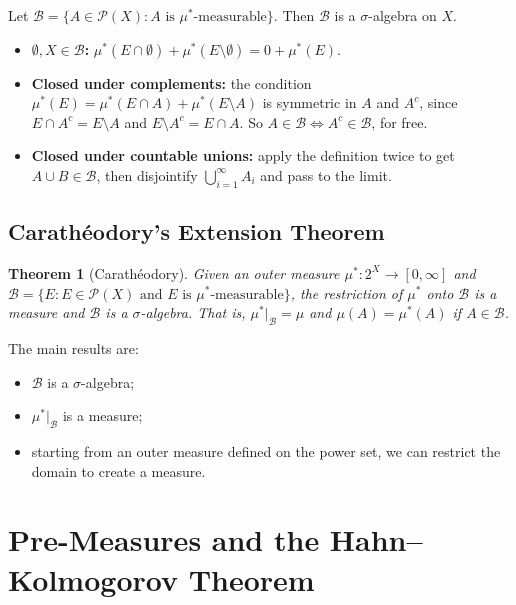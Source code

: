 \documentclass[11pt]{article}
\theoremstyle{definition}
\theoremstyle{plain}
\newtheorem{theorem}[definition]{Theorem}
\newcommand{\B}{\mathcal{B}}
\newcommand{\Pow}{\mathcal{P}}
\newcommand{\ostar}{\mu^{*}}
\begin{document}
Let $\B = \{ A \in \Pow(X) : A \text{ is } \ostar\text{-measurable} \}$.
Then $\B$ is a $\sigma$-algebra on $X$.

\begin{itemize}
  \item \textbf{$\emptyset, X \in \B$:}
        $\ostar(E \cap \emptyset) + \ostar(E \setminus \emptyset)
          = 0 + \ostar(E)$.
  \item \textbf{Closed under complements:} the condition
        $\ostar(E) = \ostar(E \cap A) + \ostar(E \setminus A)$ is
        symmetric in $A$ and $A^{c}$, since $E \cap A^{c} =
        E \setminus A$ and $E \setminus A^{c} = E \cap A$. So
        $A \in \B \iff A^{c} \in \B$, for free.
  \item \textbf{Closed under countable unions:} apply the definition
        twice to get $A \cup B \in \B$, then disjointify
        $\bigcup_{i=1}^{\infty} A_i$ and pass to the limit.
\end{itemize}

\subsection{Carath\'eodory's Extension Theorem}

\begin{theorem}[Carath\'eodory]
Given an outer measure $\ostar : 2^{X} \to [0,\infty]$ and
$\B = \{ E : E \in \Pow(X) \text{ and } E \text{ is }
\ostar\text{-measurable} \}$, the restriction of $\ostar$ onto $\B$ is a
measure and $\B$ is a $\sigma$-algebra. That is, $\ostar|_{\B} = \mu$
and $\mu(A) = \ostar(A)$ if $A \in \B$.
\end{theorem}

The main results are:
\begin{itemize}
  \item $\B$ is a $\sigma$-algebra;
  \item $\ostar|_{\B}$ is a measure;
  \item starting from an outer measure defined on the power set, we can
        restrict the domain to create a measure.
\end{itemize}

\section{Pre-Measures and the Hahn--Kolmogorov Theorem}
\end{document}
